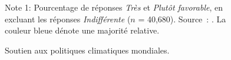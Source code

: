 \documentclass[a5paper,french]{memoir}
\begin{document}
\begin{figure}[b!]
  \caption[Soutien aux politiques climatiques mondiales]{Soutien aux politiques climatiques mondiales.} 
  \label{fig:oecd} %
  {\footnotesize \\ $\quad$ \\ Note 1: Pourcentage de réponses \textit{Très} et \textit{Plutôt favorable}, en excluant les réponses \textit{Indifférent\textperiodcentered{}e} ($n$ = 40,680). Source~: \citet{fabre_international_2023}. %
  La couleur bleue dénote une majorité relative. %
  } 
\end{figure}
\end{document}
